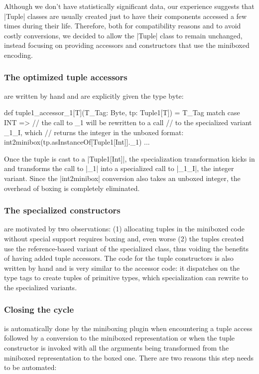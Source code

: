 Although we don't have statistically significant data, our experience suggests that |Tuple| classes are usually created just to have their components accessed a few times during their life. Therefore, both for compatibility reasons and to avoid costly conversions, we decided to allow the |Tuple| class to remain unchanged, instead focusing on providing accessors and constructors that use the miniboxed encoding.

\subsubsection{The optimized tuple accessors} are written by hand and are explicitly given the type byte:

\begin{lstlisting-nobreak}
 def tuple1_accessor_1[T](T_Tag: Byte, tp: Tuple1[T]) =
   T_Tag match {
     case INT =>
       // the call to _1 will be rewritten to a call
       // to the specialized variant _1_I, which
       // returns the integer in the unboxed format:
       int2minibox(tp.asInstanceOf[Tuple1[Int]]._1)
     ...
   }
\end{lstlisting-nobreak}

Once the tuple is cast to a |Tuple1[Int]|, the specialization transformation kicks in and transforms the call to |_1| into a specialized call to |_1_I|, the integer variant. Since the |int2minibox| conversion also takes an unboxed integer, the overhead of boxing is completely eliminated.

\subsubsection{The specialized constructors} are motivated by two observations: (1) allocating tuples in the miniboxed code without special support requires boxing and, even worse (2) the tuples created use the reference-based variant of the specialized class, thus voiding the benefits of having added tuple accessors. The code for the tuple constructors is also written by hand and is very similar to the accessor code: it dispatches on the type tags to create tuples of primitive types, which specialization can rewrite to the specialized variants.

\subsubsection{Closing the cycle} is automatically done by the miniboxing plugin when encountering a tuple access followed by a conversion to the miniboxed representation or when the tuple constructor is invoked with all the arguments being transformed from the miniboxed representation to the boxed one. There are two reasons this step needs to be automated:

